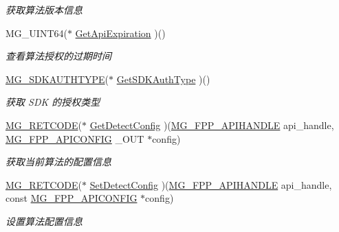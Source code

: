 \begin{DoxyCompactItemize}
\begin{DoxyCompactList}\small\item\em 获取算法版本信息 \end{DoxyCompactList}\item 
M\+G\+\_\+\+U\+I\+N\+T64($\ast$ \hyperlink{struct_m_g___f_a_c_e_p_p___a_p_i___f_u_n_c_t_i_o_n_s___t_y_p_e_a11165d90b7733e6ec43cbec1af262103}{Get\+Api\+Expiration} )()
\begin{DoxyCompactList}\small\item\em 查看算法授权的过期时间 \end{DoxyCompactList}\item 
\hyperlink{_m_g___common_8h_a3ee48a4a8bc6440c8f21fae5dfcded4c}{M\+G\+\_\+\+S\+D\+K\+A\+U\+T\+H\+T\+Y\+PE}($\ast$ \hyperlink{struct_m_g___f_a_c_e_p_p___a_p_i___f_u_n_c_t_i_o_n_s___t_y_p_e_ab3b9b8c4411b9a2127848548483aab9d}{Get\+S\+D\+K\+Auth\+Type} )()
\begin{DoxyCompactList}\small\item\em 获取 S\+DK 的授权类型 \end{DoxyCompactList}\item 
\hyperlink{_m_g___common_8h_a38fecb61b8c39592ddb51f75d4a5c5e7}{M\+G\+\_\+\+R\+E\+T\+C\+O\+DE}($\ast$ \hyperlink{struct_m_g___f_a_c_e_p_p___a_p_i___f_u_n_c_t_i_o_n_s___t_y_p_e_a1dc56210a071c3fa450ce279b36e80aa}{Get\+Detect\+Config} )(\hyperlink{_m_g___facepp_8h_ada15f635ef909e9aca52824dd580da40}{M\+G\+\_\+\+F\+P\+P\+\_\+\+A\+P\+I\+H\+A\+N\+D\+LE} api\+\_\+handle, \hyperlink{struct_m_g___f_p_p___a_p_i_c_o_n_f_i_g}{M\+G\+\_\+\+F\+P\+P\+\_\+\+A\+P\+I\+C\+O\+N\+F\+IG} \+\_\+\+O\+UT $\ast$config)
\begin{DoxyCompactList}\small\item\em 获取当前算法的配置信息 \end{DoxyCompactList}\item 
\hyperlink{_m_g___common_8h_a38fecb61b8c39592ddb51f75d4a5c5e7}{M\+G\+\_\+\+R\+E\+T\+C\+O\+DE}($\ast$ \hyperlink{struct_m_g___f_a_c_e_p_p___a_p_i___f_u_n_c_t_i_o_n_s___t_y_p_e_a2a02ef224d07da6eadd59bca70e17bdf}{Set\+Detect\+Config} )(\hyperlink{_m_g___facepp_8h_ada15f635ef909e9aca52824dd580da40}{M\+G\+\_\+\+F\+P\+P\+\_\+\+A\+P\+I\+H\+A\+N\+D\+LE} api\+\_\+handle, const \hyperlink{struct_m_g___f_p_p___a_p_i_c_o_n_f_i_g}{M\+G\+\_\+\+F\+P\+P\+\_\+\+A\+P\+I\+C\+O\+N\+F\+IG} $\ast$config)
\begin{DoxyCompactList}\small\item\em 设置算法配置信息 \end{DoxyCompactList}\item 

\end{DoxyCompactItemize}
